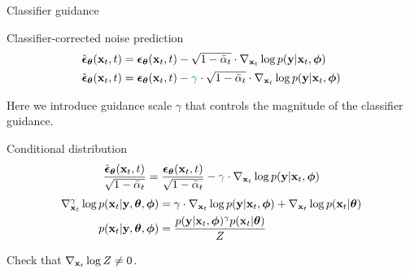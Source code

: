 \begin{frame}{Classifier guidance}
	\begin{block}{Classifier-corrected noise prediction}
		\vspace{-0.7cm}
		\begin{align*}
			\hat{\boldsymbol{\epsilon}}_{\boldsymbol{\theta}}(\mathbf{x}_t, t) &= \boldsymbol{\epsilon}_{\boldsymbol{\theta}}(\mathbf{x}_t, t) - \sqrt{1 - \bar{\alpha}_t} \cdot \nabla_{\mathbf{x}_t} \log p(\mathbf{y} | \mathbf{x}_t, \boldsymbol{\phi}) \\
			\hat{\boldsymbol{\epsilon}}_{\boldsymbol{\theta}}(\mathbf{x}_t, t) &= \boldsymbol{\epsilon}_{\boldsymbol{\theta}}(\mathbf{x}_t, t) - {\color{teal}\gamma} \cdot \sqrt{1 - \bar{\alpha}_t} \cdot \nabla_{\mathbf{x}_t} \log p(\mathbf{y} | \mathbf{x}_t, \boldsymbol{\phi})
		\end{align*}
		\vspace{-0.7cm}
	\end{block}
	Here we introduce {\color{teal} guidance scale $\gamma$} that controls the magnitude of the classifier guidance.
	\begin{block}{Conditional distribution}
		\vspace{-0.2cm}
		\[
			\frac{\hat{\boldsymbol{\epsilon}}_{\boldsymbol{\theta}}(\mathbf{x}_t, t)}{\sqrt{1 - \bar{\alpha}_t}} = \frac{\boldsymbol{\epsilon}_{\boldsymbol{\theta}}(\mathbf{x}_t, t)}{\sqrt{1 - \bar{\alpha}_t}} - {\color{teal}\gamma} \cdot \nabla_{\mathbf{x}_t} \log p(\mathbf{y} | \mathbf{x}_t, \boldsymbol{\phi})
		\]
		\vspace{-0.5cm}
		\begin{align*}
			\nabla_{\mathbf{x}_t}^{\gamma} \log p(\mathbf{x}_t | \mathbf{y}, \boldsymbol{\theta}, \boldsymbol{\phi}) &= \gamma \cdot \nabla_{\mathbf{x}_t} \log p(\mathbf{y} | \mathbf{x}_t, \boldsymbol{\phi}) + \nabla_{\mathbf{x}_t} \log p(\mathbf{x}_t | \boldsymbol{\theta}) \\
			p(\mathbf{x}_t | \mathbf{y}, \boldsymbol{\theta}, \boldsymbol{\phi}) &= \frac{p(\mathbf{y} | \mathbf{x}_t, \boldsymbol{\phi})^{\gamma} p(\mathbf{x}_t | \boldsymbol{\theta})}{Z}
		\end{align*}
		\vspace{-0.5cm}
	\end{block}
	Check that $\nabla_{\mathbf{x}_t} \log Z \neq 0$.
\end{frame}
